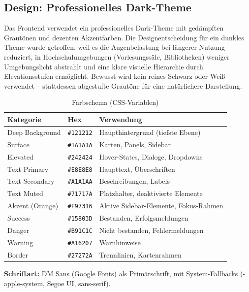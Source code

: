 \documentclass[12pt,a4paper,ngerman]{article}
\begin{document}
\subsection{Design: Professionelles Dark-Theme}

Das Frontend verwendet ein professionelles Dark-Theme mit gedämpften Grautönen und dezenten Akzentfarben. Die Designentscheidung für ein dunkles Theme wurde getroffen, weil es die Augenbelastung bei längerer Nutzung reduziert, in Hochschulumgebungen (Vorlesungssäle, Bibliotheken) weniger Umgebungslicht abstrahlt und eine klare visuelle Hierarchie durch Elevationsstufen ermöglicht. Bewusst wird kein reines Schwarz oder Weiß verwendet -- stattdessen abgestufte Grautöne für eine natürlichere Darstellung.

\begin{table}[H]
\centering
\caption{Farbschema (CSS-Variablen)}
\begin{tabular}{llL{6cm}}
\toprule
\textbf{Kategorie} & \textbf{Hex} & \textbf{Verwendung} \\
\midrule
Deep Background    & \texttt{\#121212} & Haupthintergrund (tiefste Ebene) \\
Surface            & \texttt{\#1A1A1A} & Karten, Panels, Sidebar \\
Elevated           & \texttt{\#242424} & Hover-States, Dialoge, Dropdowns \\
Text Primary       & \texttt{\#E8E8E8} & Haupttext, Überschriften \\
Text Secondary     & \texttt{\#A1A1AA} & Beschreibungen, Labels \\
Text Muted         & \texttt{\#71717A} & Platzhalter, deaktivierte Elemente \\
Akzent (Orange)    & \texttt{\#F97316} & Aktive Sidebar-Elemente, Fokus-Rahmen \\
Success            & \texttt{\#15803D} & Bestanden, Erfolgsmeldungen \\
Danger             & \texttt{\#B91C1C} & Nicht bestanden, Fehlermeldungen \\
Warning            & \texttt{\#A16207} & Warnhinweise \\
Border             & \texttt{\#27272A} & Trennlinien, Kartenrahmen \\
\bottomrule
\end{tabular}
\end{table}

\textbf{Schriftart:} DM Sans (Google Fonts) als Primärschrift, mit System-Fallbacks (-apple-system, Segoe UI, sans-serif).
\end{document}
